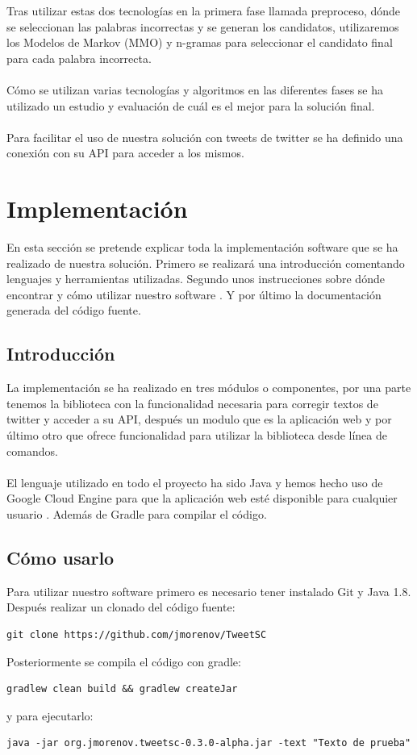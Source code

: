 \documentclass[spanish,12pt, a4paper,twoside]{paper}
\let\oldsection\section
\def\section{\cleardoublepage\oldsection}
\begin{document}
Tras utilizar estas dos tecnologías en la primera fase llamada preproceso, dónde se seleccionan las palabras incorrectas y se generan los candidatos, utilizaremos los Modelos de Markov (MMO) y n-gramas para seleccionar el candidato final para cada palabra incorrecta.\\\\
Cómo se utilizan varias tecnologías y algoritmos en las diferentes fases se ha utilizado un estudio y evaluación de cuál es el mejor para la solución final.\\\\
Para facilitar el uso de nuestra solución con tweets de twitter se ha definido una conexión con su API para acceder a los mismos.


\section{Implementación}\label{sec:implementacion}
En esta sección se pretende explicar toda la implementación software que se ha realizado de nuestra solución. Primero se realizará una introducción comentando lenguajes y herramientas utilizadas. Segundo unos instrucciones sobre dónde encontrar y cómo utilizar nuestro software . Y por último la documentación generada del código fuente.
\subsection{Introducción}\label{sec:introduccion}
La implementación se ha realizado en tres módulos o componentes, por una parte tenemos la biblioteca con la funcionalidad necesaria para corregir textos de twitter y acceder a su API, después un modulo que es la aplicación web y por último otro que ofrece funcionalidad para utilizar la biblioteca desde línea de comandos.\\\\
El lenguaje utilizado en todo el proyecto ha sido Java y hemos hecho uso de Google Cloud Engine \cite{googlecloudengine} para que la aplicación web esté disponible para cualquier usuario \cite{tweetscweb:spellchecker}. Además de Gradle para compilar el código.
\subsection{Cómo usarlo}\label{sec:comousarlo}
Para utilizar nuestro software primero es necesario tener instalado Git y Java 1.8. Después realizar un clonado del código fuente: 
\begin{verbatim}
git clone https://github.com/jmorenov/TweetSC
\end{verbatim}
Posteriormente se compila el código con gradle: 
\begin{verbatim}
gradlew clean build && gradlew createJar
\end{verbatim}
y para ejecutarlo:
\begin{verbatim}
java -jar org.jmorenov.tweetsc-0.3.0-alpha.jar -text "Texto de prueba"
\end{verbatim}
\end{document}
